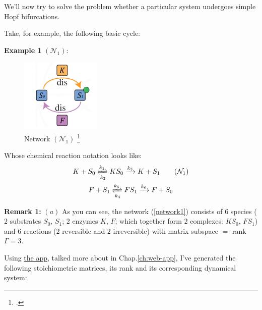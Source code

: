 We'll now try to solve the problem whether a particular system undergoes simple Hopf bifurcations.

Take, for example, the following basic cycle:

\textbf{Example 1} $(\mathcal{N}_1)$:
\begin{figure}[H]
	\centering
	\includegraphics[width=38mm]{math_pics/ex1-no-bifurcations.png}	
	\caption{Network $( \mathcal{N}_1 )$ \footcite{doi:10.1098/rsif.2014.1405}}
\end{figure}

Whose chemical reaction notation looks like:
\begin{gather}\label{network1}
	K + S_0 \xrightleftharpoons[k_2]{k_1} K S_0 \xrightarrow{k_3} K + S_1 \tag{$\mathcal{N}_1$} \\
	F + S_1 \xrightleftharpoons[k_4]{k_5} F S_1 \xrightarrow{k_6} F + S_0 \notag
\end{gather}

\textbf{Remark 1:} $(a)$ As you can see, the network (\ref{network1}) consists of $6$ species ($2$ substrates $S_0$, $S_1$; $2$ enzymes $K$, $F$; which together form $2$ complexes: $K S_0$, $F S_1$) and $6$ reactions ($2$ reversible and $2$ irreversible) with matrix subspace $=$ rank $\Gamma = 3$.

Using \href{https://github.com/viktorashi/Open-CoNtRol}{the app}, talked more about in Chap.\ref{ch:web-app}, I've generated the following stoichiometric matrices, its rank and its corresponding dynamical system:

